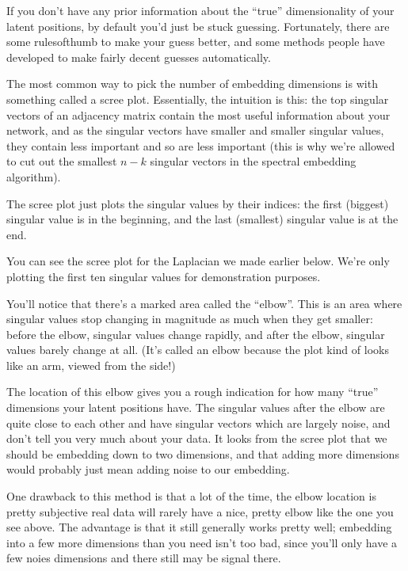 \documentclass[letterpaper,10pt,english]{jupyterBook}
\begin{document}
\sphinxAtStartPar
If you don’t have any prior information about the “true” dimensionality of your latent positions, by default you’d just be stuck guessing. Fortunately, there are some rules\sphinxhyphen{}of\sphinxhyphen{}thumb to make your guess better, and some methods people have developed to make fairly decent guesses automatically.

\sphinxAtStartPar
The most common way to pick the number of embedding dimensions is with something called a scree plot. Essentially, the intuition is this: the top singular vectors of an adjacency matrix contain the most useful information about your network, and as the singular vectors have smaller and smaller singular values, they contain less important and so are less important (this is why we’re allowed to cut out the smallest \(n-k\) singular vectors in the spectral embedding algorithm).

\sphinxAtStartPar
The scree plot just plots the singular values by their indices: the first (biggest) singular value is in the beginning, and the last (smallest) singular value is at the end.

\sphinxAtStartPar
You can see the scree plot for the Laplacian we made earlier below. We’re only plotting the first ten singular values for demonstration purposes.

\noindent{}

\sphinxAtStartPar
You’ll notice that there’s a marked area called the “elbow”. This is an area where singular values stop changing in magnitude as much when they get smaller: before the elbow, singular values change rapidly, and after the elbow, singular values barely change at all. (It’s called an elbow because the plot kind of looks like an arm, viewed from the side!)

\sphinxAtStartPar
The location of this elbow gives you a rough indication for how many “true” dimensions your latent positions have. The singular values after the elbow are quite close to each other and have singular vectors which are largely noise, and don’t tell you very much about your data. It looks from the scree plot that we should be embedding down to two dimensions, and that adding more dimensions would probably just mean adding noise to our embedding.

\sphinxAtStartPar
One drawback to this method is that a lot of the time, the elbow location is pretty subjective \sphinxhyphen{} real data will rarely have a nice, pretty elbow like the one you see above. The advantage is that it still generally works pretty well; embedding into a few more dimensions than you need isn’t too bad, since you’ll only have a few noies dimensions and there still may be  signal there.
\end{document}
